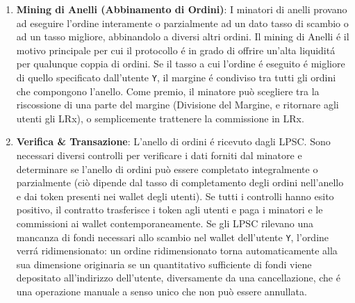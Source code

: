 \documentclass[UTF8,nofonts]{article}
\makeatletter
\newenvironment{figurehere}
 {\def\@captype{figure}}
 {}
\makeatother
\begin{document}
\begin{multicols}{2}
\begin{enumerate}
\begin{center}
\begin{figurehere}

\caption{Processo di Scambio Loopring}
\label{fig:process}
\end{figurehere}
\end{center}



\item \textbf{Mining di Anelli (Abbinamento di Ordini)}: I minatori di anelli provano ad eseguire l'ordine interamente o parzialmente ad un dato tasso di scambio o ad un tasso migliore, abbinandolo a diversi altri ordini. Il mining di Anelli \'e il motivo principale per cui il protocollo \'e in grado di offrire un'alta liquidit\'a per qualunque coppia di ordini. Se il tasso a cui l'ordine \'e eseguito \'e migliore di quello specificato dall'utente \verb|Y|, il margine \'e condiviso tra tutti gli ordini che compongono l'anello. Come premio, il minatore può scegliere tra la riscossione di una parte del margine (Divisione del Margine, e ritornare agli utenti gli LRx), o semplicemente trattenere la commissione in LRx.


\item \textbf{Verifica \& Transazione}: L'anello di ordini \'e ricevuto dagli LPSC. Sono necessari diversi controlli per verificare i dati forniti dal minatore e determinare se l'anello di ordini può essere completato integralmente o parzialmente (ciò dipende dal tasso di completamento degli ordini nell'anello e dai token presenti nei wallet degli utenti). Se tutti i controlli hanno esito positivo, il contratto trasferisce i token agli utenti e paga i minatori e le commissioni ai wallet contemporaneamente. Se gli LPSC rilevano una mancanza di fondi necessari allo scambio nel wallet dell'utente \verb|Y|, l'ordine verr\'a ridimensionato: un ordine ridimensionato torna automaticamente alla sua dimensione originaria se un quantitativo sufficiente di fondi viene depositato all'indirizzo dell'utente, diversamente da una cancellazione, che \'e una operazione manuale a senso unico che non può essere annullata.


\end{enumerate}





%
%
%


\end{multicols}
\end{document}
